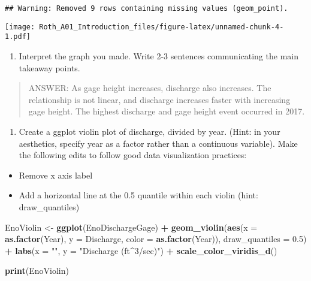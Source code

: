 \documentclass[]{article}
\newenvironment{Shaded}{\begin{snugshade}}{\end{snugshade}}
\newcommand{\DataTypeTok}[1]{\textcolor[rgb]{0.13,0.29,0.53}{#1}}
\newcommand{\FloatTok}[1]{\textcolor[rgb]{0.00,0.00,0.81}{#1}}
\newcommand{\KeywordTok}[1]{\textcolor[rgb]{0.13,0.29,0.53}{\textbf{#1}}}
\newcommand{\NormalTok}[1]{#1}
\newcommand{\OperatorTok}[1]{\textcolor[rgb]{0.81,0.36,0.00}{\textbf{#1}}}
\newcommand{\StringTok}[1]{\textcolor[rgb]{0.31,0.60,0.02}{#1}}
\providecommand{\tightlist}{%
  \setlength{\itemsep}{0pt}\setlength{\parskip}{0pt}}
\begin{document}
\begin{verbatim}
## Warning: Removed 9 rows containing missing values (geom_point).
\end{verbatim}

\texttt{[image: Roth\_A01\_Introduction\_files/figure-latex/unnamed-chunk-4-1.pdf]}

\begin{enumerate}
\def\labelenumi{\arabic{enumi}.}
\setcounter{enumi}{9}
\tightlist
\item
  Interpret the graph you made. Write 2-3 sentences communicating the
  main takeaway points.
\end{enumerate}

\begin{quote}
ANSWER: As gage height increases, discharge also increases. The
relationship is not linear, and discharge increases faster with
increasing gage height. The highest discharge and gage height event
occurred in 2017.
\end{quote}

\begin{enumerate}
\def\labelenumi{\arabic{enumi}.}
\setcounter{enumi}{10}
\tightlist
\item
  Create a ggplot violin plot of discharge, divided by year. (Hint: in
  your aesthetics, specify year as a factor rather than a continuous
  variable). Make the following edits to follow good data visualization
  practices:
\end{enumerate}

\begin{itemize}
\tightlist
\item
  Remove x axis label
\item
  Add a horizontal line at the 0.5 quantile within each violin (hint:
  draw\_quantiles)
\end{itemize}

\begin{Shaded}
\begin{Highlighting}[]
\NormalTok{EnoViolin <-}\StringTok{ }\KeywordTok{ggplot}\NormalTok{(EnoDischargeGage) }\OperatorTok{+}
\StringTok{  }\KeywordTok{geom_violin}\NormalTok{(}\KeywordTok{aes}\NormalTok{(}\DataTypeTok{x =} \KeywordTok{as.factor}\NormalTok{(Year), }\DataTypeTok{y =}\NormalTok{ Discharge, }\DataTypeTok{color =} \KeywordTok{as.factor}\NormalTok{(Year)), }
              \DataTypeTok{draw_quantiles =} \FloatTok{0.5}\NormalTok{) }\OperatorTok{+}
\StringTok{  }\KeywordTok{labs}\NormalTok{(}\DataTypeTok{x =} \StringTok{""}\NormalTok{, }\DataTypeTok{y =} \StringTok{"Discharge (ft^3/sec)"}\NormalTok{) }\OperatorTok{+}
\StringTok{  }\KeywordTok{scale_color_viridis_d}\NormalTok{()}


\KeywordTok{print}\NormalTok{(EnoViolin)}
\end{Highlighting}
\end{Shaded}
\end{document}
